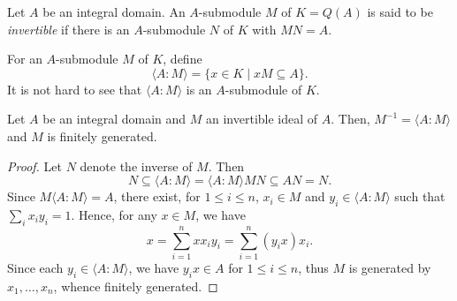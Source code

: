 \begin{definition}
    Let $A$ be an integral domain. An $A$-submodule $M$ of $K = Q(A)$ is said to be \emph{invertible} if there is an $A$-submodule $N$ of $K$ with $MN = A$. 
\end{definition}

For an $A$-submodule $M$ of $K$, define
\begin{equation*}
    \langle A:M\rangle = \{x\in K\mid xM\subseteq A\}.
\end{equation*}
It is not hard to see that $\langle A:M\rangle$ is an $A$-submodule of $K$.

\begin{proposition}
    Let $A$ be an integral domain and $M$ an invertible ideal of $A$. Then, $M^{-1} = \langle A:M\rangle$ and $M$ is finitely generated.
\end{proposition}
\begin{proof}
    Let $N$ denote the inverse of $M$. Then 
    \begin{equation*}
        N\subseteq\langle A:M\rangle = \langle A:M\rangle MN\subseteq AN = N.
    \end{equation*}
    Since $M\langle A:M\rangle = A$, there exist, for $1\le i\le n$, $x_i\in M$ and $y_i\in\langle A:M\rangle$ such that $\sum_{i}x_iy_i = 1$. Hence, for any $x\in M$, we have 
    \begin{equation*}
        x = \sum_{i = 1}^n xx_iy_i = \sum_{i = 1}^n(y_ix)x_i.
    \end{equation*}
    Since each $y_i\in\langle A:M\rangle$, we have $y_ix\in A$ for $1\le i\le n$, thus $M$ is generated by $x_1,\ldots,x_n$, whence finitely generated.
\end{proof}

